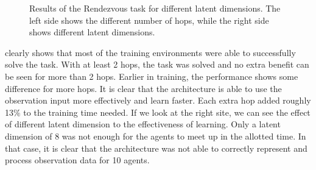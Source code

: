 \begin{figure}[htp]
    \centering
    \hspace{1cm}                       
    \caption{Results of the Rendezvous task for different latent dimensions. The left side shows the different number of hops, while the right side shows different latent dimensions.}
    \label{fig:proof_of_concept_rendezvous}
\end{figure}

 clearly shows that most of the training environments were able to successfully solve the task. With at least 2 hops, the task was solved and no extra benefit can be seen for more than 2 hops. Earlier in training, the performance shows some difference for more hops. It is clear that the architecture is able to use the observation input more effectively and learn faster. Each extra hop added roughly 13$\%$ to the training time needed. If we look at the right site, we can see the effect of different latent dimension to the effectiveness of learning. Only a latent dimension of 8 was not enough for the agents to meet up in the allotted time. In that case, it is clear that the architecture was not able to correctly represent and process observation data for 10 agents.\par

